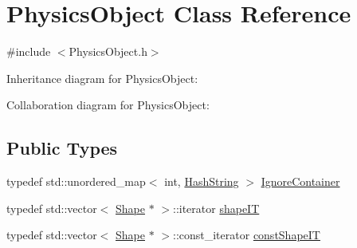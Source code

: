 \hypertarget{classPhysicsObject}{}\section{Physics\+Object Class Reference}
\label{classPhysicsObject}


{\ttfamily \#include $<$Physics\+Object.\+h$>$}



Inheritance diagram for Physics\+Object\+:


Collaboration diagram for Physics\+Object\+:
\subsection*{Public Types}
\begin{DoxyCompactItemize}
\item 
typedef std\+::unordered\+\_\+map$<$ int, \hyperlink{classHashString}{Hash\+String} $>$ \hyperlink{classPhysicsObject_a5ab17c11089e18df5c34651dbad8903a}{Ignore\+Container}
\item 
typedef std\+::vector$<$ \hyperlink{structShape}{Shape} $\ast$ $>$\+::iterator \hyperlink{classPhysicsObject_aafe647b799f851abde90d86fd19385a2}{shape\+IT}
\item 
typedef std\+::vector$<$ \hyperlink{structShape}{Shape} $\ast$ $>$\+::const\+\_\+iterator \hyperlink{classPhysicsObject_a8e53564bc32ea9ba2d306d6113dab6e7}{const\+Shape\+IT}
\end{DoxyCompactItemize}

